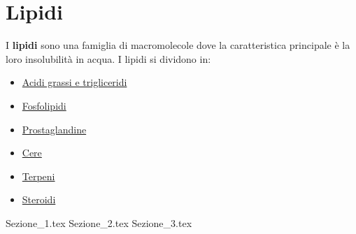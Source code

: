 \chapter{Lipidi}
I \textbf{lipidi} sono una famiglia di macromolecole dove la caratteristica principale è la loro insolubilità in acqua. I lipidi si dividono in:
\begin{itemize}
	\item \hyperref[sec:trigliceridi]{Acidi grassi e trigliceridi}
	\item \hyperref[sec:fosfolipidi]{Fosfolipidi}
	\item \hyperref[sec:prostaglandine]{Prostaglandine}
	\item \hyperref[sec:cere]{Cere}
	\item \hyperref[sec:terpeni]{Terpeni}
	\item \hyperref[sec:steroidi]{Steroidi}
\end{itemize}

{Sezione_1.tex} %
{Sezione_2.tex} %
{Sezione_3.tex} %
